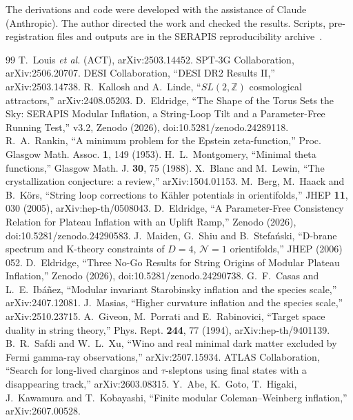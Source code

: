 \documentclass[aps,prd,twocolumn,superscriptaddress,nofootinbib,showkeys]{revtex4-2}
\begin{document}
\begin{acknowledgments}
The derivations and code were developed with the assistance of Claude (Anthropic). The author directed the work and checked the results. Scripts, pre-registration files and outputs are in the SERAPIS reproducibility archive~\cite{SERAPIS}.
\end{acknowledgments}

\begin{thebibliography}{99}
 T.~Louis \emph{et al.} (ACT), arXiv:2503.14452.
 SPT-3G Collaboration, arXiv:2506.20707.
 DESI Collaboration, ``DESI DR2 Results II,'' arXiv:2503.14738.
 R.~Kallosh and A.~Linde, ``$SL(2,\mathbb{Z})$ cosmological attractors,'' arXiv:2408.05203.
 D.~Eldridge, ``The Shape of the Torus Sets the Sky: SERAPIS Modular Inflation, a String-Loop Tilt and a Parameter-Free Running Test,'' v3.2, Zenodo (2026), doi:10.5281/zenodo.24289118.
 R.~A.~Rankin, ``A minimum problem for the Epstein zeta-function,'' Proc. Glasgow Math. Assoc. \textbf{1}, 149 (1953).
 H.~L.~Montgomery, ``Minimal theta functions,'' Glasgow Math. J. \textbf{30}, 75 (1988).
 X.~Blanc and M.~Lewin, ``The crystallization conjecture: a review,'' arXiv:1504.01153.
 M.~Berg, M.~Haack and B.~K\"ors, ``String loop corrections to K\"ahler potentials in orientifolds,'' JHEP \textbf{11}, 030 (2005), arXiv:hep-th/0508043.
 D.~Eldridge, ``A Parameter-Free Consistency Relation for Plateau Inflation with an Uplift Ramp,'' Zenodo (2026), doi:10.5281/zenodo.24290583.
 J.~Maiden, G.~Shiu and B.~Stefa\'nski, ``D-brane spectrum and K-theory constraints of $D=4$, $\mathcal N=1$ orientifolds,'' JHEP (2006) 052.
 D.~Eldridge, ``Three No-Go Results for String Origins of Modular Plateau Inflation,'' Zenodo (2026), doi:10.5281/zenodo.24290738.
 G.~F.~Casas and L.~E.~Ib\'a\~nez, ``Modular invariant Starobinsky inflation and the species scale,'' arXiv:2407.12081.
 J.~Masias, ``Higher curvature inflation and the species scale,'' arXiv:2510.23715.
 A.~Giveon, M.~Porrati and E.~Rabinovici, ``Target space duality in string theory,'' Phys. Rept. \textbf{244}, 77 (1994), arXiv:hep-th/9401139.
 B.~R.~Safdi and W.~L.~Xu, ``Wino and real minimal dark matter excluded by Fermi gamma-ray observations,'' arXiv:2507.15934.
 ATLAS Collaboration, ``Search for long-lived charginos and $\tau$-sleptons using final states with a disappearing track,'' arXiv:2603.08315.
 Y.~Abe, K.~Goto, T.~Higaki, J.~Kawamura and T.~Kobayashi, ``Finite modular Coleman--Weinberg inflation,'' arXiv:2607.00528.
\end{thebibliography}
\end{document}

